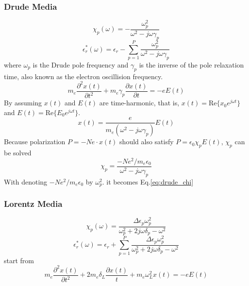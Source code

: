 \subsubsection{Drude Media}
\begin{equation}
  \label{eq:drude_chi}
  \chi_p(\omega) = -\frac{\omega_p^2}{\omega^2 - j\omega\gamma_p}  
\end{equation}
\begin{equation}
  \epsilon_r^*(\omega) = \epsilon_r - \sum_{p=1}^P \frac{\omega_p^2}{\omega^2-j\omega\gamma_p}
\end{equation}
where $\omega_p$ is the Drude pole frequency and $\gamma_p$ is the inverse of the pole relaxation time, also known as the
electron oscillision frequency.
\begin{equation}
  m_e\frac{\partial^2 x(t)}{\partial t^2} + m_e\gamma_p\frac{\partial x(t)}{\partial t} = -eE(t)
\end{equation}
By assuming $x(t)$ and $E(t)$ are time-harmonic, that is, $x(t) = \mathrm{Re}\{x_0e^{j\omega t}\}$ and $E(t) =
\mathrm{Re}\{E_0e^{j\omega t}\}$.
\begin{equation}
  x(t) = \frac{e}{m_e(\omega^2 - j\omega\gamma_p)}E(t)
\end{equation}
Because polarization $P = -Ne\cdot x(t)$ should also satisfy $P = \epsilon_0\chi_pE(t)$, $\chi_p$ can be solved
\begin{equation}
  \chi_p = \frac{-Ne^2/m_e\epsilon_0}{\omega^2 - j\omega\gamma_p}
\end{equation}
With denoting $-Ne^2/m_e\epsilon_0$ by $\omega_p^2$. it becomes Eq.\ref{eq:drude_chi}


\subsubsection{Lorentz Media}
\begin{equation}
  \label{eq:lorentz_chi}
  \chi_p(\omega) = \frac{\Delta\epsilon_p\omega_p^2}{\omega_p^2 + 2j\omega\delta_p - \omega^2}  
\end{equation}
\begin{equation}
  \epsilon_r^*(\omega) = \epsilon_r + \sum_{p=1}^P \frac{\Delta\epsilon_p\omega_p^2}{\omega_p^2 + 2j\omega\delta_p - \omega^2}  
\end{equation}
start from
\begin{equation}
    m_e\frac{\partial^2 x(t)}{\partial t^2} + 2m_e\delta_L\frac{\partial x(t)}{t} + m_e\omega_L^2x(t) = -eE(t)
\end{equation}


